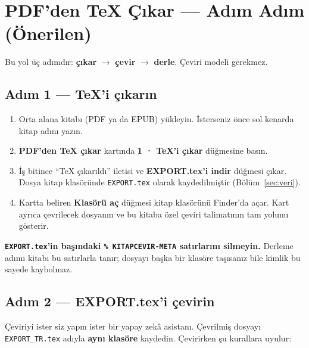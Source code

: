 \documentclass[11pt,a4paper]{article}
\newcommand{\dugme}[1]{\textsf{\bfseries #1}}
\newcommand{\dosya}[1]{\texttt{#1}}
\begin{document}
\section{PDF'den TeX Çıkar --- Adım Adım (Önerilen)}

Bu yol üç adımdır: \textbf{çıkar} \(\rightarrow\) \textbf{çevir}
\(\rightarrow\) \textbf{derle}. Çeviri modeli gerekmez.

\subsection{Adım 1 --- TeX'i çıkarın}
\begin{enumerate}
  \item Orta alana kitabı (PDF ya da EPUB) yükleyin. İsterseniz önce sol
        kenarda kitap adını yazın.
  \item \dugme{PDF'den TeX çıkar} kartında \dugme{1 · TeX'i çıkar} düğmesine
        basın.
  \item İş bitince ``TeX çıkarıldı'' iletisi ve \dugme{EXPORT.tex'i indir}
        düğmesi çıkar. Dosya kitap klasöründe \dosya{EXPORT.tex} olarak
        kaydedilmiştir (Bölüm~\ref{sec:veri}).
  \item Kartta beliren \dugme{Klasörü aç} düğmesi kitap klasörünü Finder'da
        açar. Kart ayrıca çevrilecek dosyanın ve bu kitaba özel çeviri
        talimatının tam yolunu gösterir.
\end{enumerate}

\begin{notkutu}
\textbf{\dosya{EXPORT.tex}'in başındaki \dosya{\% KITAPCEVIR-META} satırlarını
silmeyin.} Derleme adımı kitabı bu satırlarla tanır; dosyayı başka bir
klasöre taşısanız bile kimlik bu sayede kaybolmaz.
\end{notkutu}

\subsection{Adım 2 --- EXPORT.tex'i çevirin}
Çeviriyi ister siz yapın ister bir yapay zekâ asistanı. Çevrilmiş dosyayı
\dosya{EXPORT\_TR.tex} adıyla \textbf{aynı klasöre} kaydedin. Çevirirken şu
kurallara uyulur:
\end{document}
